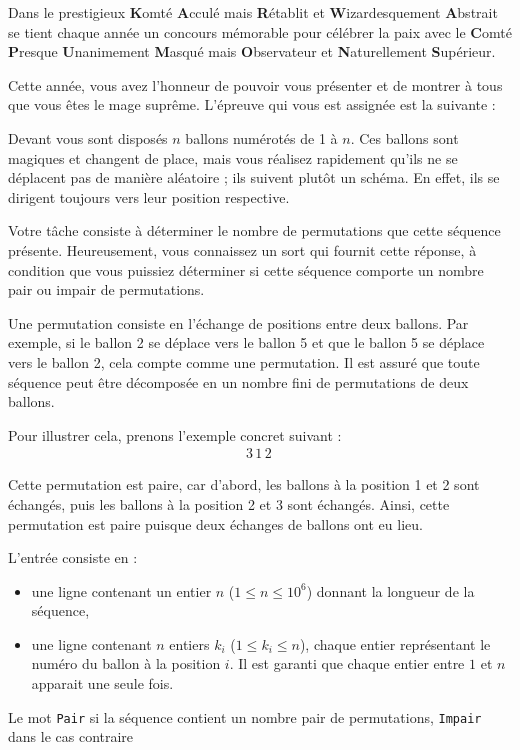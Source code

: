 \problemname{\problemyamlname}


Dans le prestigieux \textbf{K}omté \textbf{A}cculé mais \textbf{R}établit et \textbf{W}izardesquement \textbf{A}bstrait se tient chaque année un concours mémorable pour célébrer la paix avec le \textbf{C}omté \textbf{P}resque \textbf{U}nanimement \textbf{M}asqué mais \textbf{O}bservateur et \textbf{N}aturellement \textbf{S}upérieur.

Cette année, vous avez l'honneur de pouvoir vous présenter et de montrer à tous que vous êtes le mage suprême. L'épreuve qui vous est assignée est la suivante :

Devant vous sont disposés $n$ ballons numérotés de 1 à $n$. Ces ballons sont magiques et changent de place, mais vous réalisez rapidement qu'ils ne se déplacent pas de manière aléatoire ; ils suivent plutôt un schéma. En effet, ils se dirigent toujours vers leur position respective.

Votre tâche consiste à déterminer le nombre de permutations que cette séquence présente. Heureusement, vous connaissez un sort qui fournit cette réponse, à condition que vous puissiez déterminer si cette séquence comporte un nombre pair ou impair de permutations.

Une permutation consiste en l'échange de positions entre deux ballons. Par exemple, si le ballon 2 se déplace vers le ballon 5 et que le ballon 5 se déplace vers le ballon 2, cela compte comme une permutation. Il est assuré que toute séquence peut être décomposée en un nombre fini de permutations de deux ballons.

Pour illustrer cela, prenons l'exemple concret suivant :
\begin{align*}
    3\, 1\, 2\,
\end{align*}

Cette permutation est paire, car d'abord, les ballons à la position 1 et 2 sont échangés, puis les ballons à la position 2 et 3 sont échangés. Ainsi, cette permutation est paire puisque deux échanges de ballons ont eu lieu.

\begin{Input}
    L'entrée consiste en :
    \begin{itemize}
        \item une ligne contenant un entier $n$ ($1 \le n \le 10^6$) donnant la longueur de la séquence,
        \item une ligne contenant $n$ entiers $k_i $ ($1 \le k_i \le n$), chaque entier représentant le numéro du ballon à la position $i$. Il est garanti que chaque entier entre $1$ et $n$ apparait une seule fois.
    \end{itemize}
\end{Input}

\begin{Output}
    Le mot \texttt{Pair} si la séquence contient un nombre pair de permutations, \texttt{Impair} dans le cas contraire
\end{Output}